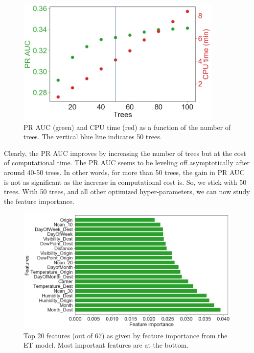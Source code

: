 \documentclass[12pt]{article}
\begin{document}
\begin{figure}[!h]
\begin{center}
\includegraphics[width=4in]{ET_tree_effects.pdf}
\end{center}
\caption{\label{fig:ET_trees}
PR AUC (green) and CPU time (red) as a function of the number of trees. The vertical blue line indicates 50 trees.}
\end{figure}
Clearly, the PR AUC improves by increasing the number of trees but at the cost of computational time. The PR AUC  seems to be leveling off asymptotically after around 40-50 trees. In other words, for more than 50 trees, the gain in PR AUC is not as significant as the increase in computational cost is. So, we stick with 50 trees. With 50 trees, and all other optimized hyper-parameters, we can now study the feature importance. 
\begin{figure}[!h]
\begin{center}
\includegraphics[width=6in]{ET_FI.pdf}
\end{center}
\caption{\label{fig:ET_FI}
Top 20 features (out of 67) as given by feature importance from the ET model. Most important features are at the bottom.}
\end{figure}
\end{document}
